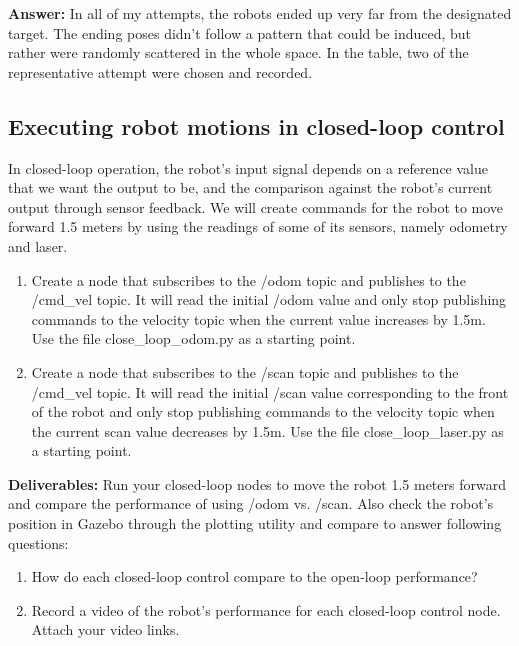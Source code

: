 \documentclass[12pt]{article}
\begin{document}
\begin{enumerate}
    \textbf{Answer: }In all of my attempts, the robots ended up very far from the designated target. The ending poses didn't follow a pattern that could be induced, but rather were randomly scattered in the whole space. In the table, two of the representative attempt were chosen and recorded.

\end{enumerate}

\subsection{Executing robot motions in closed-loop control}
In closed-loop operation, the robot’s input signal depends on a reference value that we want the output to be, and the comparison against the robot’s current output through sensor feedback. We will create commands for the robot to move forward 1.5 meters by using the readings of some of its sensors, namely odometry and laser.

\begin{enumerate}
    \item Create a node that subscribes to the /odom topic and publishes to the /cmd\_vel topic. It will read the initial /odom value and only stop publishing commands to the velocity topic when the current value increases by 1.5m. Use the file close\_loop\_odom.py as a starting point.
    
    \item Create a node that subscribes to the /scan topic and publishes to the /cmd\_vel topic. It will read the initial /scan value corresponding to the front of the robot and only stop publishing commands to the velocity topic when the current scan value decreases by 1.5m. Use the file close\_loop\_laser.py as a starting point.

\end{enumerate}

\textbf{Deliverables:}
Run your closed-loop nodes to move the robot 1.5 meters forward and compare the performance of using /odom vs. /scan. Also check the robot’s position in Gazebo through the plotting utility and compare to answer following questions:
\begin{enumerate}
    \item How do each closed-loop control compare to the open-loop performance?
    \item Record a video of the robot’s performance for each closed-loop control node. Attach your video links.
\end{enumerate}
\end{document}
